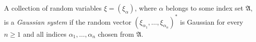 A collection of random variables $\xi = (\xi_\alpha)$, where $\alpha$ belongs to some index set $\mathfrak{A}$, is a \textit{Gaussian system} if the random vector $(\xi_{\alpha_1}, \ldots, \xi_{\alpha_n})^*$ is Gaussian for every $n \geq 1$ and all indices $\alpha_1, \ldots, \alpha_n$ chosen from $\mathfrak{A}$.
